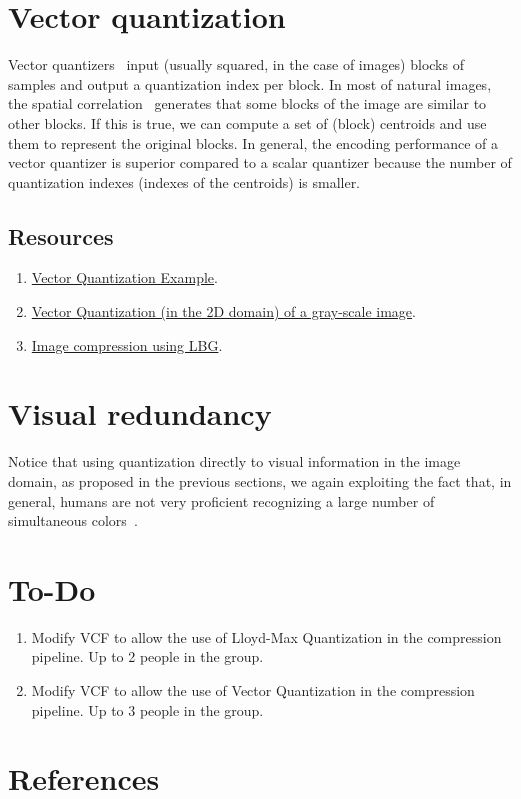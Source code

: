 \section{Vector quantization}

Vector quantizers~\cite{vruiz__vector_quantization} input (usually
squared, in the case of images) blocks of samples and output a
quantization index per block. In most of natural images, the spatial
correlation~\cite{vruiz__visual_redundancy} generates that some blocks
of the image are similar to other blocks. If this is true, we can
compute a set of (block) centroids and use them to represent the
original blocks. In general, the encoding performance of a vector
quantizer is superior compared to a scalar quantizer because the
number of quantization indexes (indexes of the centroids) is smaller.

\subsection*{Resources}

\begin{enumerate}
\item \href{https://scikit-learn.org/stable/auto_examples/cluster/plot_face_compress.html#sphx-glr-auto-examples-cluster-plot-face-compress-py}{Vector Quantization Example}.
\item
  \href{https://github.com/Sistemas-Multimedia/Sistemas-Multimedia.github.io/blob/master/contents/gray_VQ/gray_VQ.ipynb}{Vector
    Quantization (in the 2D domain) of a gray-scale image}.
\item \href{https://github.com/vicente-gonzalez-ruiz/image_vector_quantization_LBG}{Image compression using LBG}.
\end{enumerate}

\section{Visual redundancy}
Notice that using quantization directly to visual information in the
image domain, as proposed in the previous sections, we again
exploiting the fact that, in general, humans are not very proficient
recognizing a large number of simultaneous
colors~\cite{vruiz__visual_redundancy}.

\section{To-Do}
\begin{enumerate}
\item Modify VCF to allow the use of Lloyd-Max Quantization in the
  compression pipeline. Up to 2 people in the group.
\item Modify VCF to allow the use of Vector Quantization in the
  compression pipeline. Up to 3 people in the group.
\end{enumerate}

\section{References}

\renewcommand{\addcontentsline}[3]{}%

